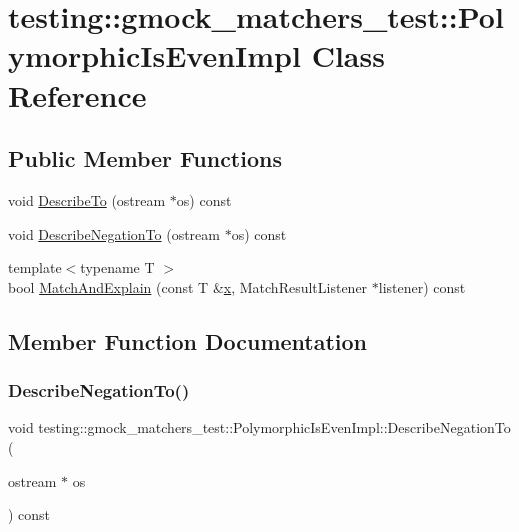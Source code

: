 \hypertarget{classtesting_1_1gmock__matchers__test_1_1_polymorphic_is_even_impl}{}\section{testing\+::gmock\+\_\+matchers\+\_\+test\+::Polymorphic\+Is\+Even\+Impl Class Reference}
\label{classtesting_1_1gmock__matchers__test_1_1_polymorphic_is_even_impl}
\subsection*{Public Member Functions}
\begin{DoxyCompactItemize}
\item 
void \mbox{\hyperlink{classtesting_1_1gmock__matchers__test_1_1_polymorphic_is_even_impl_ac07eb9f72db98b4b5489a139e844394c}{Describe\+To}} (ostream $\ast$os) const
\item 
void \mbox{\hyperlink{classtesting_1_1gmock__matchers__test_1_1_polymorphic_is_even_impl_a2e873630451f3cf6cad5bf6f82e00a33}{Describe\+Negation\+To}} (ostream $\ast$os) const
\item 
{\footnotesize template$<$typename T $>$ }\\bool \mbox{\hyperlink{classtesting_1_1gmock__matchers__test_1_1_polymorphic_is_even_impl_ab8d500c4d6c57645527fc367acf6189e}{Match\+And\+Explain}} (const T \&\mbox{\hyperlink{_obj__test_2lib_2googletest-master_2googlemock_2test_2gmock-matchers__test_8cc_a6150e0515f7202e2fb518f7206ed97dc}{x}}, Match\+Result\+Listener $\ast$listener) const
\end{DoxyCompactItemize}


\subsection{Member Function Documentation}
\mbox{\label{classtesting_1_1gmock__matchers__test_1_1_polymorphic_is_even_impl_a2e873630451f3cf6cad5bf6f82e00a33}} 
\subsubsection{\texorpdfstring{DescribeNegationTo()}{DescribeNegationTo()}}
{\footnotesize\ttfamily void testing\+::gmock\+\_\+matchers\+\_\+test\+::\+Polymorphic\+Is\+Even\+Impl\+::\+Describe\+Negation\+To (\begin{DoxyParamCaption}\item[{ostream $\ast$}]{os }\end{DoxyParamCaption}) const\hspace{0.3cm}{\ttfamily [inline]}}

